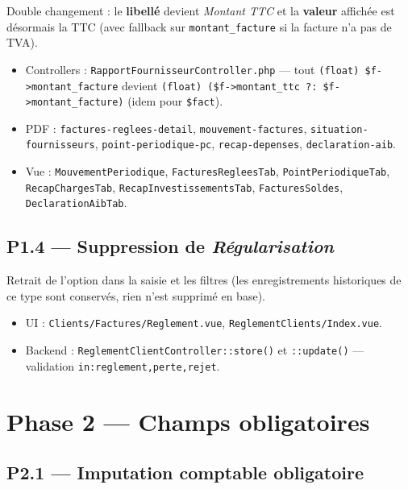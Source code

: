\documentclass[11pt,a4paper]{article}
\newcommand{\modfile}[1]{\texttt{\small #1}}
\begin{document}
Double changement : le \textbf{libellé} devient \emph{Montant TTC} et la
\textbf{valeur} affichée est désormais la TTC (avec fallback sur \texttt{montant\_facture}
si la facture n'a pas de TVA).

\begin{itemize}[leftmargin=1.4em]
  \item Controllers : \modfile{RapportFournisseurController.php} --- tout
    \texttt{(float) \$f->montant\_facture} devient
    \texttt{(float) (\$f->montant\_ttc ?: \$f->montant\_facture)} (idem pour \texttt{\$fact}).
  \item PDF : \modfile{factures-reglees-detail}, \modfile{mouvement-factures},
    \modfile{situation-fournisseurs}, \modfile{point-periodique-pc},
    \modfile{recap-depenses}, \modfile{declaration-aib}.
  \item Vue : \modfile{MouvementPeriodique}, \modfile{FacturesRegleesTab},
    \modfile{PointPeriodiqueTab}, \modfile{RecapChargesTab},
    \modfile{RecapInvestissementsTab}, \modfile{FacturesSoldes},
    \modfile{DeclarationAibTab}.
\end{itemize}

\subsection{P1.4 --- Suppression de \emph{Régularisation}}

Retrait de l'option dans la saisie et les filtres (les enregistrements
historiques de ce type sont conservés, rien n'est supprimé en base).

\begin{itemize}[leftmargin=1.4em]
  \item UI : \modfile{Clients/Factures/Reglement.vue},
    \modfile{ReglementClients/Index.vue}.
  \item Backend : \modfile{ReglementClientController::store()} et \texttt{::update()}
    --- validation \texttt{in:reglement,perte,rejet}.
\end{itemize}

\newpage

\section{Phase 2 --- Champs obligatoires}

\subsection{P2.1 --- Imputation comptable obligatoire}
\end{document}
